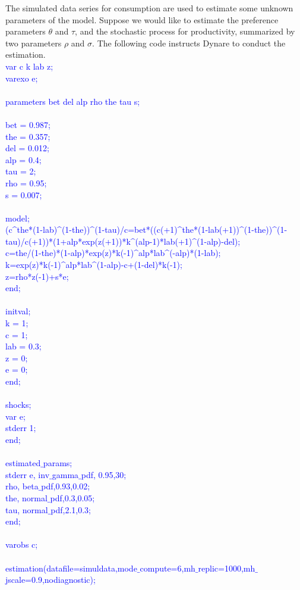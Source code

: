 \documentclass[a4paper,12pt]{scrartcl} %
\begin{document}
The simulated data series for consumption are used to estimate some unknown parameters of the model. Suppose we would like to estimate the preference parameters $\theta$ and $\tau$, and the stochastic process for productivity, summarized by two parameters $\rho$ and $\sigma$. The following code instructs Dynare to conduct the estimation.
\\
\textcolor{blue}{
var c k lab z;\\
varexo e;\\
\\
parameters bet del alp rho the tau s;\\
\\
bet     = 0.987;\\
the     = 0.357;\\
del     = 0.012;\\
alp     = 0.4;\\
tau     = 2;\\
rho     = 0.95;\\
s       = 0.007;\\
\\
model;\\
    (c\textasciicircum the*(1-lab)\textasciicircum(1-the))\textasciicircum(1-tau)/c=bet*((c(+1)\textasciicircum the*(1-lab(+1))\textasciicircum(1-the))\textasciicircum(1-tau)/c(+1))*(1+alp*exp(z(+1))*k\textasciicircum(alp-1)*lab(+1)\textasciicircum(1-alp)-del);\\
    c=the/(1-the)*(1-alp)*exp(z)*k(-1)\textasciicircum alp*lab\textasciicircum (-alp)*(1-lab);\\
    k=exp(z)*k(-1)\textasciicircum alp*lab\textasciicircum (1-alp)-c+(1-del)*k(-1);\\
    z=rho*z(-1)+s*e;\\
end;\\
\\
initval;\\
k   = 1;\\
c   = 1;\\
lab = 0.3;\\
z   = 0;\\
e   = 0;\\
end;\\
\\
shocks;\\
var e;\\
stderr 1;\\
end;\\
\\
estimated$\_$params;\\
stderr e, inv$\_$gamma$\_$pdf, 0.95,30;\\
rho, beta$\_$pdf,0.93,0.02;\\
the, normal$\_$pdf,0.3,0.05;\\
tau, normal$\_$pdf,2.1,0.3;\\
end;\\
\\
varobs c;\\
\\
estimation(datafile=simuldata,mode$\_$compute=6,mh$\_$replic=1000,mh$\_$jscale=0.9,nodiagnostic);}\\
\\
\end{document}
